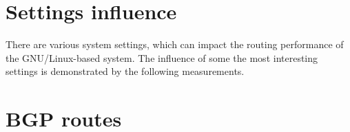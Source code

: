 	

	

	

	

\section{Settings influence}
There are various system settings, which can impact the routing performance of the GNU/Linux-based system.
The influence of some the most interesting settings is demonstrated by the following measurements.

	

	

	

	

	

	

\section{BGP routes}

	


